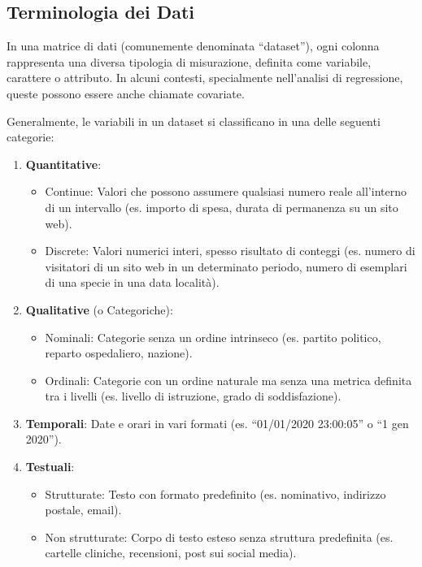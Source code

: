 \documentclass[
  letterpaper,
  DIV=11,
  numbers=noendperiod]{scrreprt}
\providecommand{\tightlist}{%
  \setlength{\itemsep}{0pt}\setlength{\parskip}{0pt}}\usepackage{longtable,booktabs,array}
\theoremstyle{definition}
\theoremstyle{remark}
\begin{document}
\subsection{Terminologia dei Dati}\label{terminologia-dei-dati}

In una matrice di dati (comunemente denominata ``dataset''), ogni
colonna rappresenta una diversa tipologia di misurazione, definita come
variabile, carattere o attributo. In alcuni contesti, specialmente
nell'analisi di regressione, queste possono essere anche chiamate
covariate.

Generalmente, le variabili in un dataset si classificano in una delle
seguenti categorie:

\begin{enumerate}
\def\labelenumi{\arabic{enumi}.}
\item
  \textbf{Quantitative}:

  \begin{itemize}
  \tightlist
  \item
    Continue: Valori che possono assumere qualsiasi numero reale
    all'interno di un intervallo (es. importo di spesa, durata di
    permanenza su un sito web).
  \item
    Discrete: Valori numerici interi, spesso risultato di conteggi (es.
    numero di visitatori di un sito web in un determinato periodo,
    numero di esemplari di una specie in una data località).
  \end{itemize}
\item
  \textbf{Qualitative} (o Categoriche):

  \begin{itemize}
  \tightlist
  \item
    Nominali: Categorie senza un ordine intrinseco (es. partito
    politico, reparto ospedaliero, nazione).
  \item
    Ordinali: Categorie con un ordine naturale ma senza una metrica
    definita tra i livelli (es. livello di istruzione, grado di
    soddisfazione).
  \end{itemize}
\item
  \textbf{Temporali}: Date e orari in vari formati (es. ``01/01/2020
  23:00:05'' o ``1 gen 2020'').
\item
  \textbf{Testuali}:

  \begin{itemize}
  \tightlist
  \item
    Strutturate: Testo con formato predefinito (es. nominativo,
    indirizzo postale, email).
  \item
    Non strutturate: Corpo di testo esteso senza struttura predefinita
    (es. cartelle cliniche, recensioni, post sui social media).
  \end{itemize}
\end{enumerate}
\end{document}
